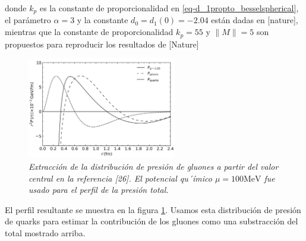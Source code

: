 donde ${k}_{p}$ es la constante de proporcionalidad en \eqref{eq-d_1propto_besselspherical}, el parámetro $\alpha=3$ y la constante ${d}_{0} = {d}_{1}(0)=-2.04$ están dadas en [nature], mientras que la constante de proporcionalidad ${k}_{p} = 55$ y $\|M\| = 5$ son propuestos para reproducir los resultados de [Nature]

\begin{figure}
\centering
\includegraphics[width=0.58\textwidth]{./Images/PressureDistributionsTot-Q-G.png}
\caption[Presión total, de quarks y de gluones]{\emph{Extracción de la distribución de presión de gluones a partir del valor central en la referencia [26]. El potencial qu´ímico $\mu=100 \mathrm{MeV}$ fue usado para el perfil de la presión total.}}
\label{fig: Presión total, de quarks y de gluones}
\end{figure}

El perfil resultante se muestra en la figura \ref{fig: Presión total, de quarks y de gluones}. Usamos esta distribución de presión de quarks para estimar la contribución de los gluones como una substracción del total mostrado arriba. 
